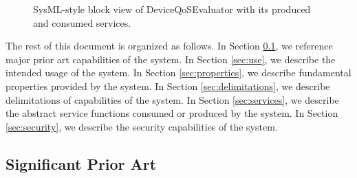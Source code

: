 \documentclass[a4paper]{arrowhead}
\begin{document}
\begin{figure}[ht!]
  \centering
  \caption{SysML-style block view of DeviceQoSEvaluator with its produced and consumed services.}
  \label{fig:system}
\end{figure}

The rest of this document is organized as follows.
In Section \ref{sec:prior_art}, we reference major prior art capabilities of the system.
In Section \ref{sec:use}, we describe the intended usage of the system.
In Section \ref{sec:properties}, we describe fundamental properties provided by the system.
In Section \ref{sec:delimitations}, we describe delimitations of capabilities of the system.
In Section \ref{sec:services}, we describe the abstract service functions consumed or produced by the system.
In Section \ref{sec:security}, we describe the security capabilities of the system.

\newpage

\subsection{Significant Prior Art}
\label{sec:prior_art}
\end{document}
